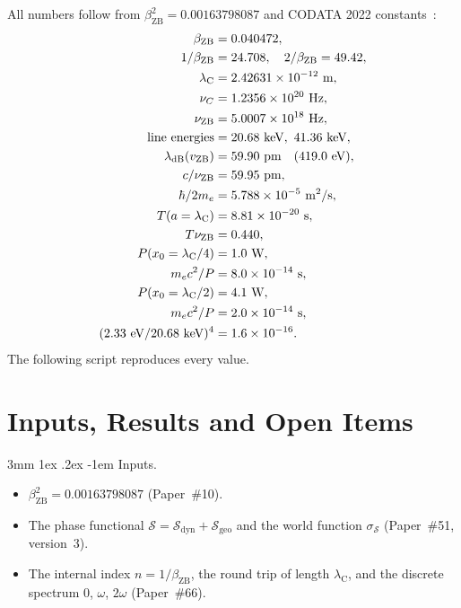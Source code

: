 \documentclass[%
 reprint, amsmath,amssymb, aps, prb, ]{revtex4-2}
\makeatletter
\numberwithin{equation}{section}
\renewcommand\paragraph{%
  \@startsection{paragraph}{4}{\z@}%
    {3mm \@plus 1ex \@minus .2ex}%
    {-1em}%
    {\normalfont\normalsize\itshape}}
\newcommand{\lambdaC}{\lambda_{\mathrm{C}}}
\newcommand{\bZB}{\beta_{\mathrm{ZB}}}
\newcommand{\Sdyn}{\mathcal{S}_{\mathrm{dyn}}}
\makeatother
\begin{document}
All numbers follow from $\bZB^2 = 0.00163798087$ and CODATA 2022 constants~\cite{CODATA2022}:
\begin{align}
\bZB &= 0.040472,
\notag\\
1/\bZB &= 24.708, \quad 2/\bZB = 49.42,
\notag\\
\lambdaC &= 2.42631\times10^{-12}\ \text{m},
\notag\\
\nu_C &= 1.2356\times10^{20}\ \text{Hz},
\notag\\
\nu_{\mathrm{ZB}} &= 5.0007\times10^{18}\ \text{Hz},
\notag\\
\text{line energies} &= 20.68\ \text{keV},\ 41.36\ \text{keV},
\notag\\
\lambda_{\mathrm{dB}}(v_{\mathrm{ZB}}) &= 59.90\ \text{pm} \quad (419.0\ \text{eV}),
\notag\\
c/\nu_{\mathrm{ZB}} &= 59.95\ \text{pm},
\notag\\
\hbar/2m_e &= 5.788\times10^{-5}\ \text{m}^2/\text{s},
\notag\\
T(a = \lambdaC) &= 8.81\times10^{-20}\ \text{s},
\notag\\
T\nu_{\mathrm{ZB}} &= 0.440,
\notag\\
P(x_0 = \lambdaC/4) &= 1.0\ \text{W},
\notag\\
m_ec^2/P &= 8.0\times10^{-14}\ \text{s},
\notag\\
P(x_0 = \lambdaC/2) &= 4.1\ \text{W},
\notag\\
m_ec^2/P &= 2.0\times10^{-14}\ \text{s},
\notag\\
(2.33\ \text{eV}/20.68\ \text{keV})^4 &= 1.6\times10^{-16}.
\label{eq:allnumbers}
\end{align}
The following script reproduces every value.



\section{Inputs, Results and Open Items}
\label{app:interface}

\paragraph{Inputs.}
\begin{itemize}[leftmargin=2.4em]
\item[I1.] $\bZB^2 = 0.00163798087$ (Paper~\#10).
\item[I2.] The phase functional $\mathcal{S} = \Sdyn + \mathcal{S}_{\mathrm{geo}}$ and the world function $\sigma_{\mathcal{S}}$ (Paper~\#51, version~3).
\item[I3.] The internal index $n = 1/\bZB$, the round trip of length $\lambdaC$, and the discrete spectrum $0$, $\omega$, $2\omega$ (Paper~\#66).
\end{itemize}
\end{document}
